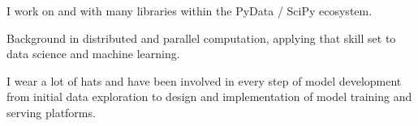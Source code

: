 I work on and with many libraries within the PyData / SciPy ecosystem.

Background in distributed and parallel computation, applying that skill
set to data science and machine learning.

I wear a lot of hats and have been involved in every step of model
development from initial data exploration to design and implementation
of model training and serving platforms.

